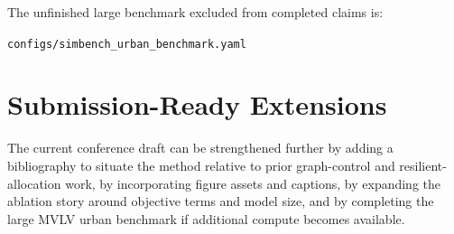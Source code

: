 \documentclass[11pt]{article}
\begin{document}
The unfinished large benchmark excluded from completed claims is:
\begin{center}
\texttt{configs/simbench\_urban\_benchmark.yaml}
\end{center}

\section{Submission-Ready Extensions}

The current conference draft can be strengthened further by adding a bibliography to situate the method relative to prior graph-control and resilient-allocation work, by incorporating figure assets and captions, by expanding the ablation story around objective terms and model size, and by completing the large MVLV urban benchmark if additional compute becomes available.
\end{document}
